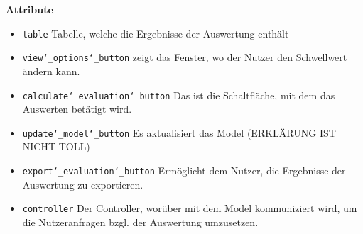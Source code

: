 \documentclass{article}
\begin{document}
\textbf{{Attribute}}
\begin{itemize}
\item \texttt{table} \newline Tabelle, welche die Ergebnisse der Auswertung enthält
\item \texttt{view\char`_options\char`_button} \newline zeigt das Fenster, wo der Nutzer den Schwellwert ändern kann.
\item \texttt{calculate\char`_evaluation\char`_button} \newline Das ist die Schaltfläche, mit dem das Auswerten betätigt wird.
\item \texttt{update\char`_model\char`_button} \newline Es aktualisiert das Model (ERKLÄRUNG IST NICHT TOLL)
\item \texttt{export\char`_evaluation\char`_button} \newline Ermöglicht dem Nutzer, die Ergebnisse der Auswertung zu exportieren.
\item \texttt{controller} \newline Der Controller, worüber mit dem Model kommuniziert wird, um die Nutzeranfragen bzgl. der Auswertung umzusetzen.
\end{itemize}
\end{document}
